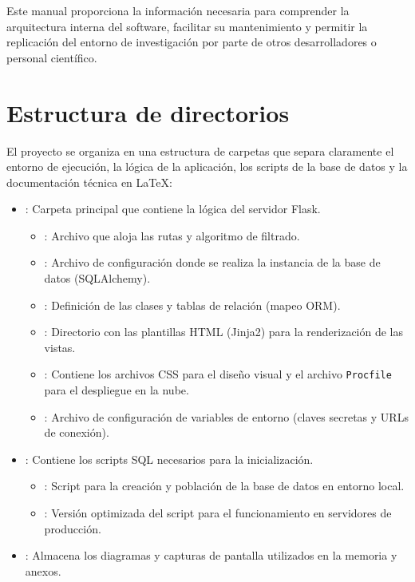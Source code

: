 
Este manual proporciona la información necesaria para comprender la arquitectura interna del software, facilitar su mantenimiento y permitir la replicación del entorno de investigación por parte de otros desarrolladores o personal científico.

\section{Estructura de directorios}
El proyecto se organiza en una estructura de carpetas que separa claramente el entorno de ejecución, la lógica de la aplicación, los scripts de la base de datos y la documentación técnica en LaTeX:

\begin{itemize}
	\item {}: Carpeta principal que contiene la lógica del servidor Flask.
	\begin{itemize}
		\item {}: Archivo que aloja las rutas y algoritmo de filtrado.
        		\item {}: Archivo de configuración donde se realiza la instancia de la base de datos (SQLAlchemy).
       		\item {}: Definición de las clases y tablas de relación (mapeo ORM).
        		\item {}: Directorio con las plantillas HTML (Jinja2) para la renderización de las vistas.
       		\item {}: Contiene los archivos CSS para el diseño visual y el archivo \texttt{Procfile} para el despliegue en la nube.
        		\item {}: Archivo de configuración de variables de entorno (claves secretas y URLs de conexión). 
	\end{itemize}
    	\item {}: Contiene los scripts SQL necesarios para la inicialización.
    	\begin{itemize}
      		  \item {}: Script para la creación y población de la base de datos en entorno local.
        		  \item {}: Versión optimizada del script para el funcionamiento en servidores de producción.
    	\end{itemize}
   	 \item {}: Almacena los diagramas y capturas de pantalla utilizados en la memoria y anexos.

\end{itemize}
